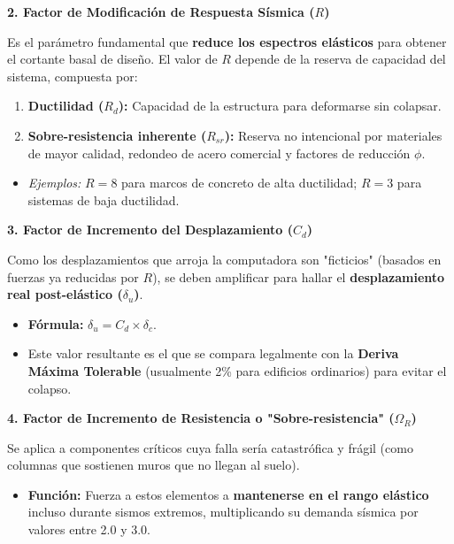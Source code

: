 \documentclass[14pt,letterpaper]{extarticle}
\begin{document}
\textbf{2. Factor de Modificación de Respuesta Sísmica ($R$)}

Es el parámetro fundamental que \textbf{reduce los espectros elásticos} para obtener el cortante basal de diseño. El valor de $R$ depende de la reserva de capacidad del sistema, compuesta por:

\begin{enumerate}
	\item \textbf{Ductilidad ($R_d$):} Capacidad de la estructura para deformarse sin colapsar.
	\item \textbf{Sobre-resistencia inherente ($R_{sr}$):} Reserva no intencional por materiales de mayor calidad, redondeo de acero comercial y factores de reducción $\phi$.
\end{enumerate}

\begin{itemize}
	\item \textit{Ejemplos:} $R=8$ para marcos de concreto de alta ductilidad; $R=3$ para sistemas de baja ductilidad.
\end{itemize}

\textbf{3. Factor de Incremento del Desplazamiento ($C_d$)}

Como los desplazamientos que arroja la computadora son "ficticios" (basados en fuerzas ya reducidas por $R$), se deben amplificar para hallar el \textbf{desplazamiento real post-elástico ($\delta_u$)}.

\begin{itemize}
	\item \textbf{Fórmula:} $\delta_u = C_d \times \delta_c$.
	\item Este valor resultante es el que se compara legalmente con la \textbf{Deriva Máxima Tolerable} (usualmente 2\% para edificios ordinarios) para evitar el colapso.
\end{itemize}

\textbf{4. Factor de Incremento de Resistencia o "Sobre-resistencia" ($\Omega_R$)}

Se aplica a componentes críticos cuya falla sería catastrófica y frágil (como columnas que sostienen muros que no llegan al suelo).

\begin{itemize}
	\item \textbf{Función:} Fuerza a estos elementos a \textbf{mantenerse en el rango elástico} incluso durante sismos extremos, multiplicando su demanda sísmica por valores entre 2.0 y 3.0.
\end{itemize}
\end{document}
